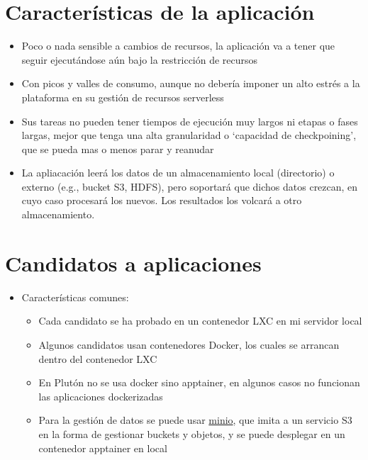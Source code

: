 \documentclass[preprint,3p]{elsarticle}
\begin{document}
\newpage

\section{Características de la aplicación}

\begin{itemize}

	\item Poco o nada sensible a cambios de recursos, la aplicación va a tener que seguir ejecutándose aún bajo la restricción de recursos

	\item Con picos y valles de consumo, aunque no debería imponer un alto estrés a la plataforma en su gestión de recursos serverless
		

	\item Sus tareas no pueden tener tiempos de ejecución muy largos ni etapas o fases largas, mejor que tenga una alta granularidad o `capacidad de checkpoining', que se pueda mas o menos parar y reanudar
	
	\item La apliacación leerá los datos de un almacenamiento local (directorio) o externo (e.g., bucket S3, HDFS), pero soportará que dichos datos crezcan, en cuyo caso procesará los nuevos. Los resultados los volcará a otro almacenamiento.
			
\end{itemize}


\section{Candidatos a aplicaciones}


\begin{itemize}
	\item Características comunes:
	\begin{itemize}
		\item Cada candidato se ha probado en un contenedor LXC en mi servidor local
		\item Algunos candidatos usan contenedores Docker, los cuales se arrancan dentro del contenedor LXC
		\item En Plutón no se usa docker sino apptainer, en algunos casos no funcionan las aplicaciones dockerizadas
		\item Para la gestión de datos se puede usar \href{https://min.io/}{minio}, que imita a un servicio S3 en la forma de gestionar buckets y objetos, y se puede desplegar en un contenedor apptainer en local
	\end{itemize}
\end{itemize}
\end{document}
